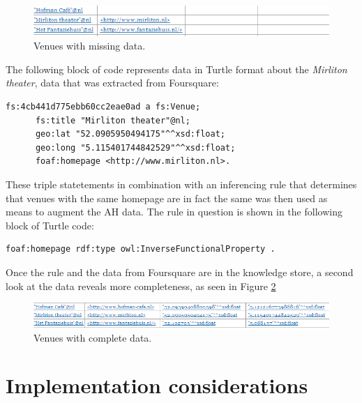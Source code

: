 \documentclass[hidelinks,a4paper]{article}
\begin{document}
\begin{figure}[h!]
  \centering
    \includegraphics[scale=0.6]{images/venues_missing_data.png}    
    \caption{Venues with missing data.}
    \label{fig:ah_miss_data}
\end{figure}

The following block of code represents data in Turtle format about the \emph{Mirliton theater}, data that was extracted from Foursquare:

\begin{center}
\begin{verbatim}
fs:4cb441d775ebb60cc2eae0ad a fs:Venue;
      fs:title "Mirliton theater"@nl;
      geo:lat "52.0905950494175"^^xsd:float;
      geo:long "5.115401744842529"^^xsd:float;
      foaf:homepage <http://www.mirliton.nl>.
\end{verbatim}
\end{center}

These triple statetements in combination with an inferencing rule that determines that venues with the same homepage are in fact the same was then used as means to augment the AH data. The rule in question is shown in the following block of Turtle code:

\begin{center}
\begin{verbatim}
foaf:homepage rdf:type owl:InverseFunctionalProperty .
\end{verbatim}
\end{center}

Once the rule and the data from Foursquare are in the knowledge store, a second look at the data reveals more completeness, as seen in Figure \ref{fig:ah_more_data}

\begin{figure}[h!]
  \centering
    \includegraphics[scale=0.6]{images/venues_complete_data.png}    
    \caption{Venues with complete data.}
    \label{fig:ah_more_data}
\end{figure}

\section{Implementation considerations}\label{considerations}
\end{document}
